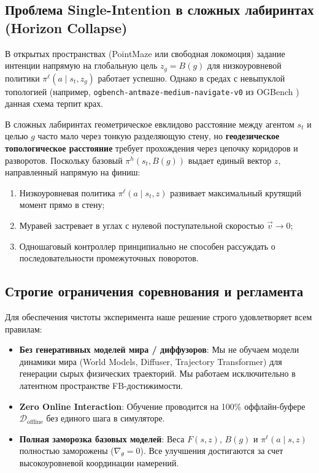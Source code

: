\subsection{Проблема Single-Intention в сложных лабиринтах (Horizon Collapse)}

В открытых пространствах (PointMaze или свободная локомоция) задание интенции напрямую на глобальную цель $z_g = B(g)$ для низкоуровневой политики $\pi^\ell(a \mid s_t, z_g)$ работает успешно. Однако в средах с невыпуклой топологией (например, \texttt{ogbench-antmaze-medium-navigate-v0} из OGBench \cite{ogbench2024}) данная схема терпит крах.

\begin{keyinsight}
В сложных лабиринтах геометрическое евклидово расстояние между агентом $s_t$ и целью $g$ часто мало через тонкую разделяющую стену, но \textbf{геодезическое топологическое расстояние} требует прохождения через цепочку коридоров и разворотов. Поскольку базовый $\pi^h(s_t, B(g))$ выдает единый вектор $z$, направленный напрямую на финиш:
\begin{enumerate}[leftmargin=*,noitemsep]
    \item Низкоуровневая политика $\pi^\ell(a \mid s_t, z)$ развивает максимальный крутящий момент прямо в стену;
    \item Муравей застревает в углах с нулевой поступательной скоростью $\vec{v} \to 0$;
    \item Одношаговый контроллер принципиально не способен рассуждать о последовательности промежуточных поворотов.
\end{enumerate}
\end{keyinsight}

\subsection{Строгие ограничения соревнования и регламента}
Для обеспечения чистоты эксперимента наше решение строго удовлетворяет всем правилам:
\begin{itemize}[leftmargin=*,noitemsep]
    \item \textbf{Без генеративных моделей мира / диффузоров}: Мы не обучаем модели динамики мира (World Models, Diffuser, Trajectory Transformer) для генерации сырых физических траекторий. Мы работаем исключительно в латентном пространстве FB-достижимости.
    \item \textbf{Zero Online Interaction}: Обучение проводится на 100\% оффлайн-буфере $\mathcal{D}_{\text{offline}}$ без единого шага в симуляторе.
    \item \textbf{Полная заморозка базовых моделей}: Веса $F(s, z)$, $B(g)$ и $\pi^\ell(a \mid s, z)$ полностью заморожены ($\nabla_\theta = 0$). Все улучшения достигаются за счет высокоуровневой координации намерений.
\end{itemize}
